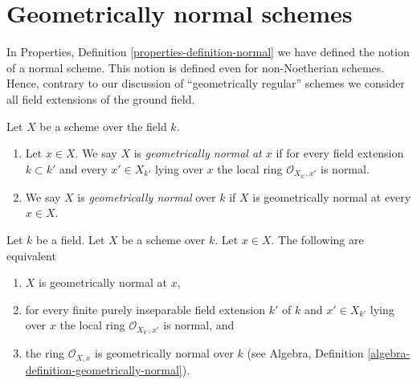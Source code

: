 \section{Geometrically normal schemes}
\label{section-geometrically-normal}

\noindent
In Properties, Definition \ref{properties-definition-normal}
we have defined the notion of a normal scheme.
This notion is defined even for non-Noetherian
schemes. Hence, contrary to our discussion of
``geometrically regular'' schemes we consider all
field extensions of the ground field.

\begin{definition}
\label{definition-geometrically-normal}
Let $X$ be a scheme over the field $k$.
\begin{enumerate}
\item Let $x \in X$. We say $X$ is
{\it geometrically normal at $x$} if for every
field extension $k \subset k'$ and every $x' \in X_{k'}$ lying over $x$
the local ring $\mathcal{O}_{X_{k'}, x'}$ is normal.
\item We say $X$ is {\it geometrically normal} over $k$ if $X$
is geometrically normal at every $x \in X$.
\end{enumerate}
\end{definition}

\begin{lemma}
\label{lemma-geometrically-normal-at-point}
Let $k$ be a field.
Let $X$ be a scheme over $k$.
Let $x \in X$.
The following are equivalent
\begin{enumerate}
\item $X$ is geometrically normal at $x$,
\item for every finite purely inseparable field extension $k'$ of $k$
and $x' \in X_{k'}$ lying over $x$ the local ring
$\mathcal{O}_{X_{k'}, x'}$ is normal, and
\item the ring $\mathcal{O}_{X, x}$ is geometrically
normal over $k$ (see
Algebra, Definition \ref{algebra-definition-geometrically-normal}).
\end{enumerate}
\end{lemma}

